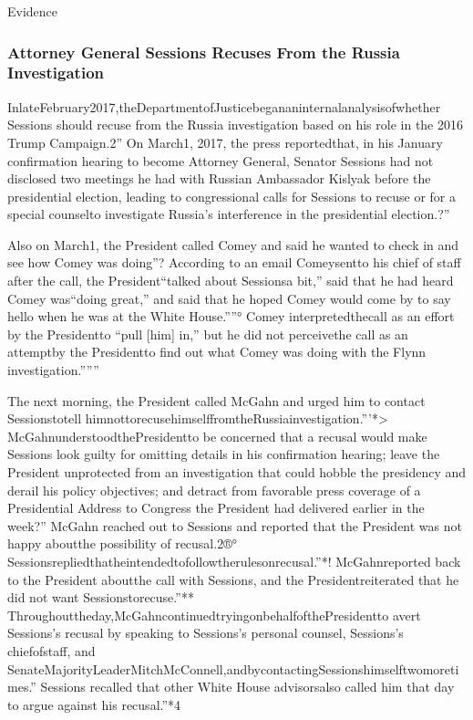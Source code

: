 Evidence

\subsubsection{Attorney General Sessions Recuses From the Russia Investigation}

InlateFebruary2017,theDepartmentofJusticebegananinternalanalysisofwhether Sessions should recuse from the Russia investigation based on his role in the 2016 Trump Campaign.2”
On March1, 2017, the press reportedthat, in his January confirmation hearing to become Attorney General, Senator Sessions had not disclosed two meetings he had with Russian Ambassador Kislyak before the presidential election, leading to congressional calls for Sessions to recuse or for a special counselto investigate Russia’s interference in the presidential election.?”

Also on March1, the President called Comey and said he wanted to check in and see how Comey was doing”?
According to an email Comeysentto his chief of staff after the call, the President“talked about Sessionsa bit,” said that he had heard Comey was“doing great,” and said that he hoped Comey would come by to say hello when he was at the White House.””°
Comey interpretedthecall as an effort by the Presidentto “pull [him] in,” but he did not perceivethe call as an attemptby the Presidentto find out what Comey was doing with the Flynn investigation.”””

The next morning, the President called McGahn and urged him to contact Sessionstotell himnottorecusehimselffromtheRussiainvestigation.”’*>
McGahnunderstoodthePresidentto be concerned that a recusal would make Sessions look guilty for omitting details in his confirmation hearing; leave the President unprotected from an investigation that could hobble the presidency and derail his policy objectives; and detract from favorable press coverage of a Presidential Address to Congress the President had delivered earlier in the week?”
McGahn reached out to Sessions and reported that the President was not happy aboutthe possibility of recusal.2®°
Sessionsrepliedthatheintendedtofollowtherulesonrecusal.”*!
McGahnreported back to the President aboutthe call with Sessions, and the Presidentreiterated that he did not want Sessionstorecuse.”**
Throughouttheday,McGahncontinuedtryingonbehalfofthePresidentto avert Sessions’s recusal by speaking to Sessions’s personal counsel, Sessions’s chiefofstaff, and SenateMajorityLeaderMitchMcConnell,andbycontactingSessionshimselftwomoretimes.”
Sessions recalled that other White House advisorsalso called him that day to argue against his recusal.”*4

